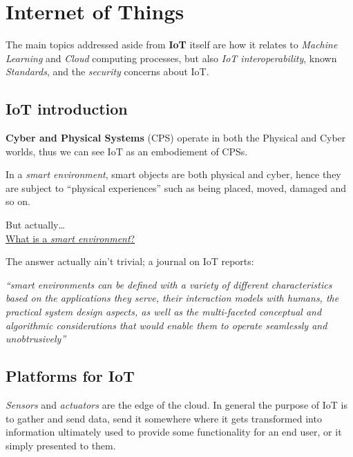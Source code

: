 \chapter{Internet of Things}

The main topics addressed aside from \textbf{IoT} itself are how it relates to \textit{Machine Learning} and \textit{Cloud} computing processes, but also \textit{IoT interoperability}, known \textit{Standards}, and the \textit{security} concerns about IoT.

\section{IoT introduction}
\textbf{Cyber and Physical Systems} (CPS) operate in both the Physical and Cyber worlds, thus we can see IoT as an embodiement of CPSs.

In a \textit{smart environment}, smart objects are both physical and cyber, hence they are subject to ``physical experiences'' such as being placed, moved, damaged and so on.
\begin{center}
   But actually\dots\\
   \ul{What is a \textit{smart environment}?}
\end{center}

The answer actually ain't trivial;
a journal on IoT reports:
\begin{center}
\textit{``smart environments can be defined with a variety of different characteristics based on the applications they serve, their interaction models with humans, the practical system design aspects, as well as the multi-faceted conceptual and algorithmic considerations that would enable them to operate seamlessly and unobtrusively''}
\end{center}

\section{Platforms for IoT}
\textit{Sensors} and \textit{actuators} are the edge of the cloud.
In general the purpose of IoT is to gather and send data, send it somewhere where it gets transformed into information ultimately used to provide some functionality for an end user, or it simply presented to them.

